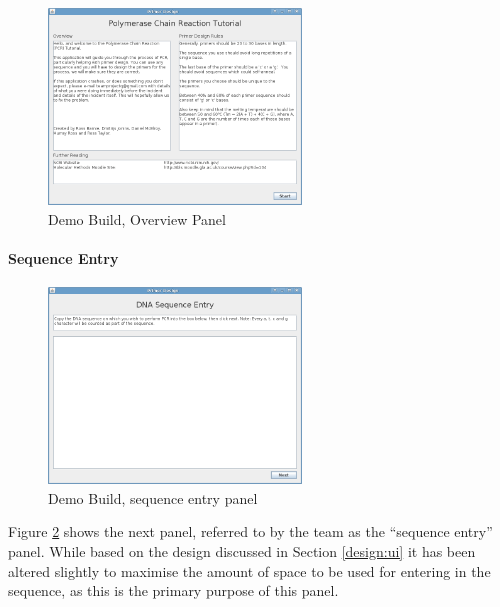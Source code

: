 \begin{figure}[!t]
  \begin{center}
    \includegraphics[width=0.6\textwidth]{./images/demoBuild/splash.png}
    \caption{
      \label{fig:demoBuild:splash}
      Demo Build, Overview Panel 
    }
  \end{center}
\end{figure}

\paragraph{Sequence Entry}

\begin{figure}[!t]
  \begin{center}
    \includegraphics[width=0.6\textwidth]{./images/demoBuild/sequenceEntry.png}
    \caption{
      \label{fig:demoBuild:sequenceEntry}
      Demo Build, sequence entry panel 
    }
  \end{center}
\end{figure}

Figure \ref{fig:demoBuild:sequenceEntry} shows the next panel,
referred to by the team as the ``sequence entry'' panel.
While based on the design discussed in Section \ref{design:ui} it
has been altered slightly to maximise the amount of space to be used
for entering in the sequence, as this is the primary purpose of this
panel.

